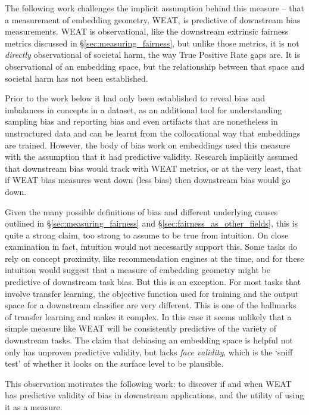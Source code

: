 The following work challenges the implicit assumption behind this measure -- that a measurement of embedding geometry, WEAT, is predictive of downstream bias measurements.
WEAT is observational, like the downstream extrinsic fairness metrics discussed in \S \ref{sec:measuring_fairness}, but unlike those metrics, it is not \textit{directly} observational of societal harm, the way True Positive Rate gaps are. It is observational of an embedding space, but the relationship between that space and societal harm has not been established. 

Prior to the work below it had only been established to reveal bias and imbalances in concepts in a dataset, as an additional tool for understanding sampling bias and reporting bias and even artifacts that are nonetheless in unstructured data and can be learnt from the collocational way that embeddings are trained. However, the body of bias work on embeddings used this measure with the assumption that it had predictive validity. Research implicitly assumed that downstream bias would track with WEAT metrics, or at the very least, that if WEAT bias measures went down (less bias) then downstream bias would go down.

Given the many possible definitions of bias and different underlying causes outlined in \S \ref{sec:measuring_fairness} and \S \ref{sec:fairness_as_other_fields}, this is quite a strong claim, too strong to assume to be true from intuition. On close examination in fact, intuition would not necessarily support this. Some tasks do rely on concept proximity, like recommendation engines at the time, and for these intuition would suggest that a measure of embedding geometry might be predictive of downstream task bias. But this is an exception. For most tasks that involve transfer learning, the objective function used for training and the output space for a downstream classifier are very different. This is one of the hallmarks of transfer learning and makes it complex. In this case it seems unlikely that a simple measure like WEAT will be consistently predictive of the variety of downstream tasks.
The claim that debiasing an embedding space is helpful not only has unproven predictive validity, but lacks \textit{face validity}, which is the `sniff test' of whether it looks on the surface level to be plausible.  

This observation motivates the following work: to discover if and when WEAT has predictive validity of bias in downstream applications, and the utility of using it as a measure.  
